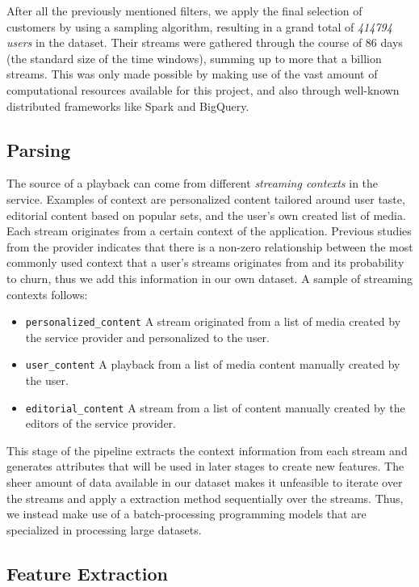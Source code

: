 \documentclass{kththesis}
\begin{document}
After all the previously mentioned filters, we apply the final selection of customers by using a sampling algorithm, resulting in a grand total of \emph{414794 users} in the dataset. Their streams were gathered through the course of 86 days (the standard size of the time windows), summing up to more that a billion streams. This was only made possible by making use of the vast amount of computational resources available for this project, and also through well-known distributed frameworks like Spark and BigQuery. 

\subsection{Parsing}

The source of a playback can come from different \emph{streaming contexts} in the service. Examples of context are personalized content tailored around user taste, editorial content based on popular sets, and the user's own created list of media. Each stream originates from a certain context of the application. Previous studies from the provider indicates that there is a non-zero relationship between the most commonly used context that a user's streams originates from and its probability to churn, thus we add this information in our own dataset. A sample of streaming contexts follows:

\begin{itemize}
  \item \verb|personalized_content| A stream originated from a list of media created by the service provider and personalized to the user.	
  \item \verb|user_content| A playback from a list of media content manually created by the user.
   \item \verb|editorial_content| A stream from a list of content manually created by the editors of the service provider.
\end{itemize}

This stage of the pipeline extracts the context information from each stream and generates attributes that will be used in later stages to create new features. The sheer amount of data available in our dataset makes it unfeasible to iterate over the streams and apply a extraction method sequentially over the streams. Thus, we instead make use of a batch-processing programming models that are specialized in processing large datasets. 

\subsection{Feature Extraction}
\end{document}
